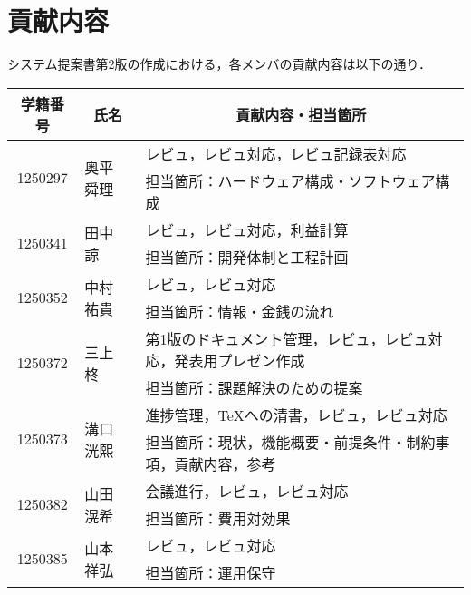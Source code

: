\chapter{貢献内容}
システム提案書第2版の作成における，各メンバの貢献内容は以下の通り．
\begin{table}[h]
	\centering
	\begin{tabularx}{\textwidth}{cll}
		\multicolumn{1}{c}{学籍番号} & \multicolumn{1}{c}{氏名} & \multicolumn{1}{c}{貢献内容・担当箇所}    \\
		\hline
		\multirow{2}{*}{1250297} & \multirow{2}{*}{奥平 舜理} & レビュ，レビュ対応，レビュ記録表対応               \\
		                         &                        & 担当箇所：ハードウェア構成・ソフトウェア構成           \\
		\hline
		\multirow{2}{*}{1250341} & \multirow{2}{*}{田中 諒}  & レビュ，レビュ対応，利益計算                   \\
		                         &                        & 担当箇所：開発体制と工程計画                   \\
		\hline
		\multirow{2}{*}{1250352} & \multirow{2}{*}{中村 祐貴} & レビュ，レビュ対応                        \\
		                         &                        & 担当箇所：情報・金銭の流れ                    \\
		\hline
		\multirow{2}{*}{1250372} & \multirow{2}{*}{三上 柊}  & 第1版のドキュメント管理，レビュ，レビュ対応，発表用プレゼン作成 \\
		                         &                        & 担当箇所：課題解決のための提案                  \\
		\hline
		\multirow{2}{*}{1250373} & \multirow{2}{*}{溝口 洸熙} & 進捗管理，\TeX への清書，レビュ，レビュ対応         \\
		                         &                        & 担当箇所：現状，機能概要・前提条件・制約事項，貢献内容，参考   \\
		\hline
		\multirow{2}{*}{1250382} & \multirow{2}{*}{山田 滉希} & 会議進行，レビュ，レビュ対応                   \\
		                         &                        & 担当箇所：費用対効果                       \\
		\hline
		\multirow{2}{*}{1250385} & \multirow{2}{*}{山本 祥弘} & レビュ，レビュ対応                        \\
		                         &                        & 担当箇所：運用保守                        \\
		\hline
	\end{tabularx}
\end{table}